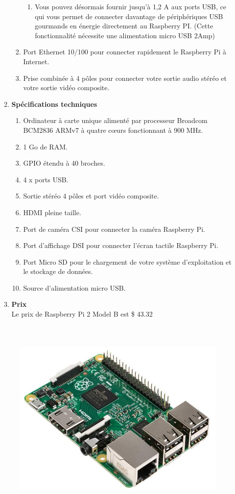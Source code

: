 \documentclass[12pt]{article}
\begin{document}
\begin{itemize}
\begin{enumerate}
\begin{enumerate}
		\begin{enumerate}
			\item Vous pouvez désormais fournir jusqu'à 1,2 A aux ports USB, ce qui vous permet de connecter davantage de périphériques USB gourmands en énergie directement au Raspberry PI. (Cette fonctionnalité nécessite une alimentation micro USB 2Amp)
		\end{enumerate}
		\item Port Ethernet 10/100 pour connecter rapidement le Raspberry Pi à Internet.
		\item Prise combinée à 4 pôles pour connecter votre sortie audio stéréo et votre sortie vidéo composite.
\end{enumerate}
	\item \textbf{Spécifications techniques}\\
		\begin{enumerate}
			\item Ordinateur à carte unique alimenté par processeur Broadcom BCM2836 ARMv7 à quatre cœurs fonctionnant à 900 MHz.
			\item 1 Go de RAM.
			\item GPIO étendu à 40 broches.
			\item 4 x ports USB.
			\item Sortie stéréo 4 pôles et port vidéo composite.
			\item HDMI pleine taille.
			\item Port de caméra CSI pour connecter la caméra Raspberry Pi.
			\item Port d’affichage DSI pour connecter l’écran tactile Raspberry Pi.
			\item Port Micro SD pour le chargement de votre système d'exploitation et le stockage de données.
			\item Source d'alimentation micro USB.
\end{enumerate}
\newpage
	\item \textbf{Prix}\\
	Le prix de Raspberry Pi 2 Model B est \$ 43.32
	\end{enumerate}
	\begin{figure}[h]
		\centernig
		\includegraphics[height=10cm,width=12cm]{img-Chapiter-3/raspbPi.jpg}

\end{figure}
\end{itemize}
\end{document}
